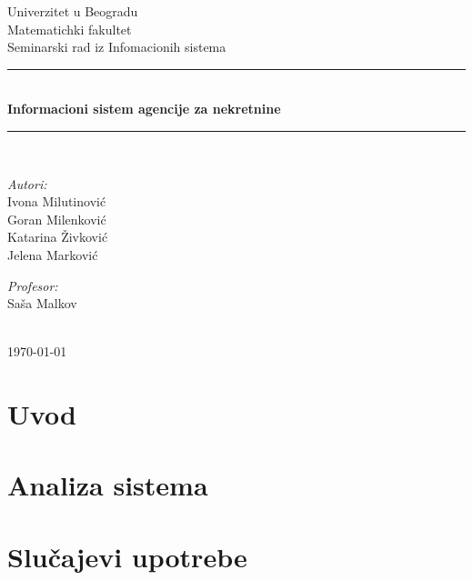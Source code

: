 \documentclass{article}
\begin{document}
\begin{titlepage}

\newcommand{\HRule}{\rule{\linewidth}{0.5mm}}
\center
\textup{\Large Univerzitet u Beogradu\\Matematichki fakultet}\\[1.5cm]
\textup{\Large Seminarski rad iz Infomacionih sistema}\\[0.4cm]

\HRule \\[0.4cm]
{ \huge \bfseries Informacioni sistem agencije za nekretnine}\\[0.4cm]
\HRule \\[8.5cm]

\begin{minipage}{0.4\textwidth}
\begin{flushleft}
\large
\emph{Autori:}\\
\textup Ivona Milutinovi\' c\\
\textup Goran Milenkovi\' c\\
\textup Katarina \v Zivkovi\' c\\
\textup Jelena Markovi\' c

\end{flushleft}
\end{minipage}
\hfill
\begin{minipage}{0.4\textwidth}
\begin{flushright}
\large
\emph{Profesor:} \\
\textup Sa\v sa Malkov\\
\end{flushright}
\end{minipage}\\[2cm]


{\textup \large \today}\\[1cm]

\end{titlepage}

\newpage
\tableofcontents

\newpage
\section{\bfseries Uvod}

\newpage
\section{\bfseries Analiza sistema}

\newpage
\section{\bfseries Slu\v{c}ajevi upotrebe}
\end{document}

